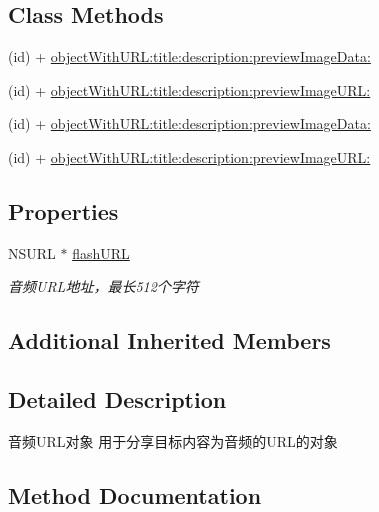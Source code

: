 \subsection*{Class Methods}
\begin{DoxyCompactItemize}
\item 
(id) + \mbox{\hyperlink{interface_q_q_api_audio_object_a9ed620e580a9d0113247d89ce2ab64d1}{object\+With\+U\+R\+L\+:title\+:description\+:preview\+Image\+Data\+:}}
\item 
(id) + \mbox{\hyperlink{interface_q_q_api_audio_object_a5236f620725be473b356536ebe378fa7}{object\+With\+U\+R\+L\+:title\+:description\+:preview\+Image\+U\+R\+L\+:}}
\item 
(id) + \mbox{\hyperlink{interface_q_q_api_audio_object_a9ed620e580a9d0113247d89ce2ab64d1}{object\+With\+U\+R\+L\+:title\+:description\+:preview\+Image\+Data\+:}}
\item 
(id) + \mbox{\hyperlink{interface_q_q_api_audio_object_a5236f620725be473b356536ebe378fa7}{object\+With\+U\+R\+L\+:title\+:description\+:preview\+Image\+U\+R\+L\+:}}
\end{DoxyCompactItemize}
\subsection*{Properties}
\begin{DoxyCompactItemize}
\item 
\mbox{\label{interface_q_q_api_audio_object_a546a501bbcef83fdad6b028eaa1ebca1}} 
N\+S\+U\+RL $\ast$ \mbox{\hyperlink{interface_q_q_api_audio_object_a546a501bbcef83fdad6b028eaa1ebca1}{flash\+U\+RL}}
\begin{DoxyCompactList}\small\item\em 音频\+U\+R\+L地址，最长512个字符 \end{DoxyCompactList}\end{DoxyCompactItemize}
\subsection*{Additional Inherited Members}


\subsection{Detailed Description}
音频\+U\+R\+L对象 用于分享目标内容为音频的\+U\+R\+L的对象 

\subsection{Method Documentation}
\mbox{\label{interface_q_q_api_audio_object_a9ed620e580a9d0113247d89ce2ab64d1}} 
